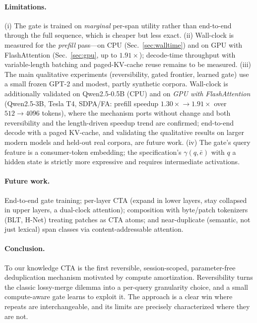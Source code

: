 \documentclass[11pt]{article}
\newcommand{\ebar}{\bar{e}}
\begin{document}
\paragraph{Limitations.} (i) The gate is trained on \emph{marginal} per-span utility rather
than end-to-end through the full sequence, which is cheaper but less exact. (ii) Wall-clock
is measured for the \emph{prefill} pass---on CPU (Sec.~\ref{sec:walltime}) and on GPU with
FlashAttention (Sec.~\ref{sec:gpu}, up to $1.91\times$); decode-time throughput with
variable-length batching and paged-KV-cache reuse remains to be measured. (iii)
The main qualitative experiments (reversibility, gated frontier, learned gate) use a small
frozen GPT-2 and modest, partly synthetic corpora. Wall-clock is additionally validated on
Qwen2.5-0.5B (CPU) and on \emph{GPU with FlashAttention} (Qwen2.5-3B, Tesla T4, SDPA/FA:
prefill speedup $1.30\times\!\to\!1.91\times$ over $512\!\to\!4096$ tokens), where the
mechanism ports without change and both reversibility and the length-driven speedup trend
are confirmed; end-to-end decode with a paged KV-cache, and validating the qualitative
results on larger modern models and held-out real corpora, are future work. (iv) The gate's
query feature is a consumer-token embedding; the specification's $\gamma(q,\ebar)$ with $q$
a hidden state is strictly more expressive and requires intermediate activations.

\paragraph{Future work.} End-to-end gate training; per-layer CTA (expand in lower layers,
stay collapsed in upper layers, a dual-clock attention); composition with byte/patch
tokenizers (BLT, H-Net) treating patches as CTA atoms; and near-duplicate (semantic, not
just lexical) span classes via content-addressable attention.

\paragraph{Conclusion.} To our knowledge CTA is the first reversible, session-scoped,
parameter-free deduplication mechanism motivated by compute amortization. Reversibility
turns the classic lossy-merge dilemma into a per-query granularity choice, and a small
compute-aware gate learns to exploit it. The approach is a clear win where repeats are
interchangeable, and its limits are precisely characterized where they are not.
\end{document}
